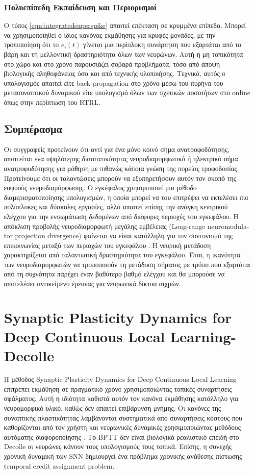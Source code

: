 \documentclass[12pt]{report}
\begin{document}
\subsubsection{Πολυεπίπεδη Εκπαίδευση και Περιορισμοί}

Ο τύπος \ref{eqn:integratedsuperspike} απαιτεί επέκταση σε κρυμμένα επίπεδα. Μπορεί να χρησιμοποιηθεί ο ίδιος κανόνας εκμάθησης για κρυφές μονάδες, με την τροποποίηση ότι το $e_{i}(t)$ γίνεται μια περίπλοκη συνάρτηση που εξαρτάται από τα βάρη και τη μελλοντική δραστηριότητα όλων των νευρώνων. Αυτή η μη τοπικότητα στο χώρο και στο χρόνο παρουσιάζει σοβαρά προβλήματα, τόσο από άποψη βιολογικής αληθοφάνειας όσο και από τεχνικής υλοποιήσης. Τεχνικά, αυτός ο υπολογισμός απαιτεί είτε \textlatin{back-propagation} στο χρόνο μέσω του πυρήνα του μετασυναπτικού δυναμικού είτε υπολογισμό όλων των σχετικών ποσοτήτων στο \textlatin{online} όπως στην περίπτωση του \textlatin{RTRL}.
\subsection{Συμπέρασμα}
Οι συγγραφείς προτείνουν ότι αντί για ένα μόνο κοινό σήμα ανατροφοδότησης, απαιτείται ενα υψηλότερης διαστατικότητας νευροδιαμορφωτικό ή ηλεκτρικό σήμα ανατροφοδότησης για μάθηση με πιθανώς κάποια γνώση της πορείας τροφοδοσίας. Προτείνουμε ότι οι ταλαντώσεις μπορούν να εξυπηρετήσουν αυτόν τον σκοπό της ευφυούς νευροδιαμόρφωσης. Ο εγκέφαλος χρησιμοποιεί μια μέθοδο διαμερισματοποίησης υπολογισμών, η οποία μπορεί να του επιτρέψει να εκτελέσει πιο πολύπλοκες και δύσκολες εργασίες, αλλά απαιτεί επίσης την ανάγκη κεντρικού ελέγχου για την ενσωμάτωση δεδομένων από διάφορες περιοχές του εγκεφάλου. Η απόκλιση προβολής νευροδιαμορφωτή μεγάλης εμβέλειας (\textlatin{Long-range neuromodulator projection divergence}) φαίνεται να είναι κατάλληλη για τον συντονισμό της επικοινωνίας μεταξύ των περιοχών του εγκεφάλου \cite{ito2008}. Η νευρική μετάδοση χαρακτηρίζεται από ταλαντωτική δραστηριότητα του εγκεφάλου. Έτσι, η ικανότητα των νευροδιαμορφωτών να τροποποιούν τη μετάδοση σήματος με τρόπο που εξαρτάται από τη συχνότητα παρέχει έναν βαθύτερο βαθμό ελέγχου και θα μπορούσε να αποτελέσει αντικείμενο έρευνας για νευρωνικά δίκτυα αιχμών.

\section{\textlatin{Synaptic Plasticity Dynamics for Deep Continuous Local Learning}-\textlatin{Decolle}}
H μέθοδος \textlatin{Synaptic Plasticity Dynamics for Deep Continuous Local Learning} \cite{kaiser2020} επιτρέπει εκμάθηση σε πραγματικό χρόνο χρησιμοποιώντας τοπικές συναρτήσεις σφάλματος. Αυτή η ιδιότητα καθιστά αυτόν τον κανόνα εκμάθησης κατάλληλο για νευρομορφικό υλικό, καθώς δεν απαιτεί επιβάρυνση μνήμης. Οι κανόνες της συναπτικής πλαστικότητας λαμβάνονται συστηματικά από συναρτήσεις κόστους που καθορίζονται από τον χρήστη και νευρωνικές δυναμικές χρησιμοποιώντας μεθόδους αυτόματης διαφοροποίησης . Το \textlatin{BPTT} δεν είναι βιολογικά ρεαλιστικό επειδή στο \textlatin{Decolle} οι νευρώνες κάνουν τους υπολογισμούς τους τοπικά. Επίσης, η συνεχής χρονική δυναμική των \textlatin{SNN} δημιουργεί ένα πρόβλημα χρονικής ανάθεσης πίστωσης \textlatin{temporal credit assignment problem}.
\end{document}
